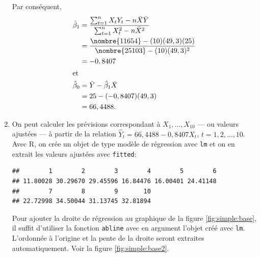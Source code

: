 \begin{solution}{2.1}
\begin{enumerate}
\begin{displaymath}
      \end{displaymath}
      Par conséquent,
      \begin{align*}
        \hat{\beta}_1
        &= \frac{\sum_{t=1}^n X_t Y_t - n \bar{X}\bar{Y}}{\sum_{t=1}^n
          X_t^2 - n \bar{X}^2} \\
        &= \frac{\nombre{11654} - (10)(49,3)(25)}{\nombre{25103} -
          (10)(49,3)^2} \\
        &= -0,8407 \\
        \intertext{et}
        \hat{\beta}_0
        &=\bar{Y}-\hat{\beta}_1\bar{X}\\
        &=25 - (-0,8407)(49,3)\\
        &=66,4488.
      \end{align*}
    \item On peut calculer les prévisions correspondant à $X_1, \dots,
      X_{10}$ --- ou valeurs ajustées --- à partir de la relation
      $\hat{Y}_t = 66,4488 - 0,8407 X_t$, $t = 1, 2, \dots, 10$. Avec
      \textsf{R}, on crée un objet de type modèle de régression avec
      \texttt{lm} et on en extrait les valeurs ajustées avec
      \texttt{fitted}:
\begin{knitrout}
\color{fgcolor}\begin{kframe}
\begin{alltt}
 \hlkwb{<-}  \hlopt{~} 
\end{alltt}
\begin{verbatim}
##        1        2        3        4        5        6
## 11.80028 30.29670 29.45596 16.84476 16.00401 24.41148
##        7        8        9       10
## 22.72998 34.50044 31.13745 32.81894
\end{verbatim}
\end{kframe}
\end{knitrout}
      Pour ajouter la droite de régression au graphique de la figure
      \ref{fig:simple:base}, il suffit d'utiliser la fonction
      \texttt{abline} avec en argument l'objet créé avec
      \texttt{lm}. L'ordonnée à l'origine et la pente de la droite
      seront extraites automatiquement. Voir la figure \ref{fig:simple:base2}.
      \begin{figure}
        \centering
\begin{knitrout}
\color{fgcolor}\begin{kframe}
\begin{alltt}

\end{alltt}
\end{kframe}
\end{knitrout}
\end{figure}
\end{enumerate}
\end{solution}
